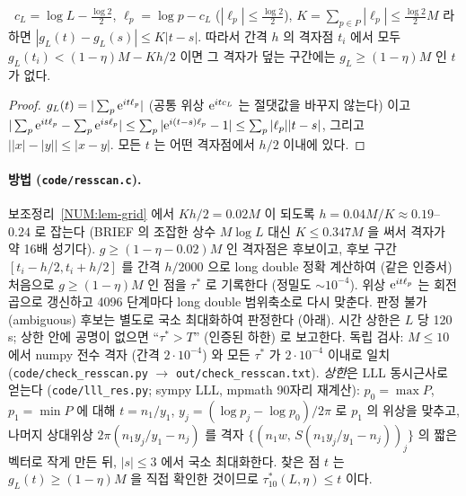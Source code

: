\begin{lemma}[격자 인증서]\label{NUM:lem-grid}
\PROVED\ $c_L=\log L-\frac{\log 2}{2}$, $\ell_p=\log p-c_L$ ($|\ell_p|\le\frac{\log2}{2}$), $K=\sum_{p\in P}|\ell_p|\le\frac{\log2}{2}M$ 라 하면
$|g_L(t)-g_L(s)|\le K|t-s|$. 따라서 간격 $h$ 의 격자점 $t_i$ 에서 모두 $g_L(t_i)<(1-\eta)M-Kh/2$ 이면
그 격자가 덮는 구간에는 $g_L\ge(1-\eta)M$ 인 $t$ 가 없다.
\end{lemma}
\begin{proof}
$g_L(t)=|\sum_p \mathrm{e}^{it\ell_p}|$ (공통 위상 $\mathrm{e}^{itc_L}$ 는 절댓값을 바꾸지 않는다) 이고
$|\sum_p\mathrm{e}^{it\ell_p}-\sum_p\mathrm{e}^{is\ell_p}|\le\sum_p|\mathrm{e}^{i(t-s)\ell_p}-1|\le\sum_p|\ell_p||t-s|$, 그리고 $\bigl||x|-|y|\bigr|\le|x-y|$.
모든 $t$ 는 어떤 격자점에서 $h/2$ 이내에 있다.
\end{proof}

\paragraph{방법 (\texttt{code/resscan.c}).}
보조정리~\ref{NUM:lem-grid} 에서 $Kh/2=0.02M$ 이 되도록 $h=0.04M/K\approx0.19$--$0.24$ 로 잡는다
(BRIEF 의 조잡한 상수 $M\log L$ 대신 $K\le 0.347M$ 을 써서 격자가 약 16배 성기다).
$g\ge(1-\eta-0.02)M$ 인 격자점은 후보이고, 후보 구간 $[t_i-h/2,t_i+h/2]$ 를 간격 $h/2000$ 으로 long double 정확 계산하여
(같은 인증서) 처음으로 $g\ge(1-\eta)M$ 인 점을 $\tau^*$ 로 기록한다 (정밀도 $\sim10^{-4}$). 위상 $\mathrm{e}^{it\ell_p}$ 는 회전 곱으로 갱신하고
4096 단계마다 long double 범위축소로 다시 맞춘다. 판정 불가(ambiguous) 후보는 별도로 국소 최대화하여 판정한다 (아래).
시간 상한은 $L$ 당 120\,s; 상한 안에 공명이 없으면 ``$\tau^*>T$'' (인증된 하한) 로 보고한다.
독립 검사: $M\le10$ 에서 numpy 전수 격자 (간격 $2\cdot10^{-4}$) 와 모든 $\tau^*$ 가 $2\cdot10^{-4}$ 이내로 일치
(\texttt{code/check\_resscan.py} $\to$ \texttt{out/check\_resscan.txt}).
\emph{상한}은 LLL 동시근사로 얻는다 (\texttt{code/lll\_res.py}; sympy LLL, mpmath 90자리 재계산):
$p_0=\max P$, $p_1=\min P$ 에 대해 $t=n_1/y_1$, $y_j=(\log p_j-\log p_0)/2\pi$ 로 $p_1$ 의 위상을 맞추고,
나머지 상대위상 $2\pi(n_1y_j/y_1-n_j)$ 를 격자 $\{(n_1w,\,S(n_1y_j/y_1-n_j))_j\}$ 의 짧은 벡터로 작게 만든 뒤, $|s|\le3$ 에서 국소 최대화한다.
찾은 점 $t$ 는 $g_L(t)\ge(1-\eta)M$ 을 직접 확인한 것이므로 $\tau^*_{10}(L,\eta)\le t$ 이다.

